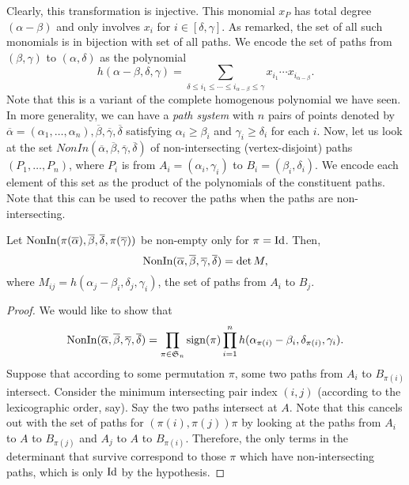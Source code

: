 	Clearly, this transformation is injective. This monomial $x_P$ has total degree $(\alpha - \beta)$ and only involves $x_i$ for $i \in [\delta,\gamma]$. As remarked, the set of all such monomials is in bijection with set of all paths. We encode the set of paths from $(\beta,\gamma)$ to $(\alpha,\delta)$ as the polynomial
	\[ h(\alpha-\beta,\delta,\gamma) = \sum_{\delta \le i_1 \le \cdots \le i_{\alpha-\beta} \le \gamma} x_{i_1} \cdots x_{i_{\alpha-\beta}}. \]
	Note that this is a variant of the complete homogenous polynomial we have seen.\\
	In more generality, we can have a \emph{path system} with $n$ pairs of points denoted by $\overline{\alpha} = (\alpha_1,\ldots,\alpha_n), \overline{\beta}, \overline{\gamma}, \overline{\delta}$ satisfying $\alpha_i \ge \beta_i$ and $\gamma_i \ge \delta_i$ for each $i$. Now, let us look at the set $NonIn(\overline{\alpha},\overline{\beta},\overline{\gamma},\overline{\delta})$ of non-intersecting (vertex-disjoint) paths $(P_1,\ldots,P_n)$, where $P_i$ is from $A_i = (\alpha_i,\gamma_i)$ to $B_i = (\beta_i,\delta_i)$. We encode each element of this set as the product of the polynomials of the constituent paths. Note that this can be used to recover the paths when the paths are non-intersecting.
	
	\begin{ftheo}
		Let $\operatorname{NonIn}(\pi(\overline{\alpha}),\overline{\beta},\overline{\delta},\pi(\overline{\gamma}))$ be non-empty only for $\pi = \operatorname{Id}$. Then,
		\[ \operatorname{NonIn}(\overline{\alpha},\overline{\beta},\overline{\gamma},\overline{\delta}) = \det M, \]
		where $M_{ij} = h(\alpha_j - \beta_i,\delta_j,\gamma_i)$, the set of paths from $A_i$ to $B_j$.
	\end{ftheo}
	\begin{proof}
		We would like to show that
		\[ \operatorname{NonIn}(\overline{\alpha},\overline{\beta},\overline{\gamma},\overline{\delta}) = \prod_{\pi \in \mathfrak{S}_n} \operatorname{sign}(\pi) \prod_{i=1}^n h(\alpha_{\pi(i)} - \beta_i , \delta_{\pi(i)} , \gamma_i). \]
		Suppose that according to some permutation $\pi$, some two paths from $A_i$ to $B_{\pi(i)}$ intersect. Consider the minimum intersecting pair index $(i,j)$ (according to the lexicographic order, say). Say the two paths intersect at $A$. Note that this cancels out with the set of paths for $(\pi(i), \pi(j)) \pi$ by looking at the paths from $A_i$ to $A$ to $B_{\pi(j)}$ and $A_j$ to $A$ to $B_{\pi(i)}$. Therefore, the only terms in the determinant that survive correspond to those $\pi$ which have non-intersecting paths, which is only $\operatorname{Id}$ by the hypothesis.
	\end{proof}

